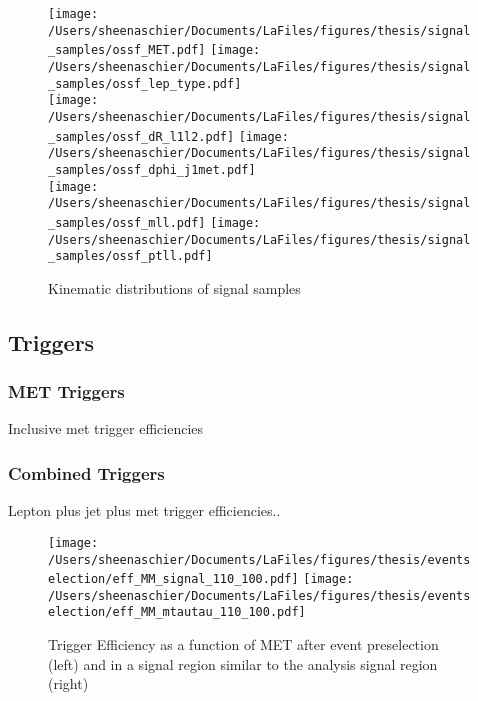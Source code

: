 \documentclass[11pt, oneside]{article}   	%
\begin{document}
   \begin{figure}[tbp]
\texttt{[image: /Users/sheenaschier/Documents/LaFiles/figures/thesis/signal\_samples/ossf\_MET.pdf]}
\texttt{[image: /Users/sheenaschier/Documents/LaFiles/figures/thesis/signal\_samples/ossf\_lep\_type.pdf]}\\
 \texttt{[image: /Users/sheenaschier/Documents/LaFiles/figures/thesis/signal\_samples/ossf\_dR\_l1l2.pdf]}
 \texttt{[image: /Users/sheenaschier/Documents/LaFiles/figures/thesis/signal\_samples/ossf\_dphi\_j1met.pdf]}\\
 \texttt{[image: /Users/sheenaschier/Documents/LaFiles/figures/thesis/signal\_samples/ossf\_mll.pdf]}
 \texttt{[image: /Users/sheenaschier/Documents/LaFiles/figures/thesis/signal\_samples/ossf\_ptll.pdf]}\\
   \caption{Kinematic distributions of signal samples}
   \label{fig:SigSample2}
 \end{figure}

 \FloatBarrier
\subsection{Triggers}
\label{sec:eff}

\subsubsection{MET Triggers}
\label{sec:met}
Inclusive met trigger efficiencies

\subsubsection{Combined Triggers}
Lepton plus jet plus met trigger efficiencies..

  \begin{figure}[tbp]
     \texttt{[image: /Users/sheenaschier/Documents/LaFiles/figures/thesis/eventselection/eff\_MM\_signal\_110\_100.pdf]}
       \texttt{[image: /Users/sheenaschier/Documents/LaFiles/figures/thesis/eventselection/eff\_MM\_mtautau\_110\_100.pdf]}\\
   \caption{Trigger Efficiency as a function of MET after event preselection (left) and in a signal region similar to the analysis signal region (right)}
   \label{fig:TrigEff1}
 \end{figure}
 
\end{document}

